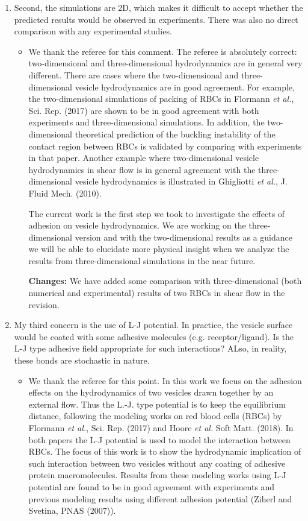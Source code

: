 \documentclass[11pt]{article}
\newcommand{\comment}[1]{{\color{blue} #1}}
\begin{document}
\begin{enumerate}
\begin{itemize}
  
\end{itemize}

\noindent
\item\comment{Second, the simulations are 2D, which makes it difficult to accept
whether the predicted results would be observed in experiments. There
was also no direct comparison with any experimental studies.}
\begin{itemize}
  \item We thank the referee for this comment. The referee is absolutely correct: two-dimensional and three-dimensional hydrodynamics are in general very different. There are
  cases where the two-dimensional and three-dimensional  vesicle hydrodynamics are in good agreement. For example, the two-dimensional simulations of packing of RBCs in Flormann {\it et al.}, Sci. Rep. (2017) are shown to be in good agreement with both experiments and three-dimensional simulations. In addition, the two-dimensional theoretical prediction of the buckling instability of the contact region between RBCs is validated by comparing with experiments in that paper.
  Another example where two-dimensional vesicle hydrodynamics in shear flow is in general agreement with the three-dimensional vesicle hydrodynamics is illustrated in Ghigliotti {\it et al.}, J. Fluid Mech. (2010). 
  
  The current work is the first step we took to investigate the effects of adhesion on vesicle hydrodynamics. We are working on the three-dimensional version  and with the two-dimensional results as a guidance we will be able to elucidate more physical insight when we analyze the results from three-dimensional simulations in the near future.
  
  \noindent
  {\bf Changes:} We have added some comparison with three-dimensional (both numerical and experimental) results of two RBCs in shear flow in the revision.
\end{itemize}

\noindent
\item\comment{My third concern is the use of L-J potential. In practice, the
vesicle surface would be coated with some adhesive molecules (e.g.
receptor/ligand). Is the L-J type adhesive field appropriate for such
interactions? ALso, in reality, these bonds are stochastic in nature.}
\begin{itemize}
  \item We thank the referee for this point. 
   In this work we focus on the adhesion effects on the hydrodynamics 
   of two vesicles drawn together by an external flow.
   Thus the L.-J. type potential is to keep the equilibrium distance, 
   following the modeling works on red blood cells (RBCs) by Flormann {\it et al.}, Sci. Rep. (2017) and Hoore {\it et al.} Soft Matt. (2018).
  In both papers the L-J potential is used to model the interaction between RBCs. The focus of this work is to show the hydrodynamic implication of such interaction between two vesicles without any coating of adhesive protein macromolecules. Results from these modeling works using L-J potential are found to be in good agreement with experiments and previous modeling results using different adhesion potential (Ziherl and Svetina, PNAS (2007)).
  

\end{itemize}
\end{enumerate}
\end{document}
